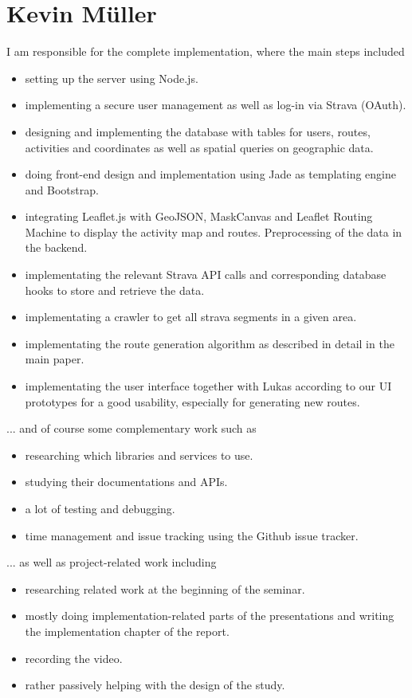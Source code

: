\documentclass{sigchi}
\begin{document}
\section{Kevin M\"uller}
I am responsible for the complete implementation, where the main steps included
\begin{itemize}
\item setting up the server using Node.js.
\item implementing a secure user management as well as log-in via Strava (OAuth).
\item designing and implementing the database with tables for users, routes, activities and coordinates as well as spatial queries on geographic data.
\item doing front-end design and implementation using Jade as templating engine and Bootstrap.
\item integrating Leaflet.js with GeoJSON, MaskCanvas and Leaflet Routing Machine to display the activity map and routes. Preprocessing of the data in the backend.
\item implementating the relevant Strava API calls and corresponding database hooks to store and retrieve the data.
\item implementating a crawler to get all strava segments in a given area.
\item implementating the route generation algorithm as described in detail in the main paper.
\item implementating the user interface together with Lukas according to our UI prototypes for a good usability, especially for generating new routes.
\end{itemize}
... and of course some complementary work such as
\begin{itemize}
\item researching which libraries and services to use.
\item studying their documentations and APIs.
\item a lot of testing and debugging.
\item time management and issue tracking using the Github issue tracker.
\end{itemize}
... as well as project-related work including
\begin{itemize}
\item researching related work at the beginning of the seminar.
\item mostly doing implementation-related parts of the presentations and writing the implementation chapter of the report.
\item recording the video.
\item rather passively helping with the design of the study.
\end{itemize}
\end{document}

